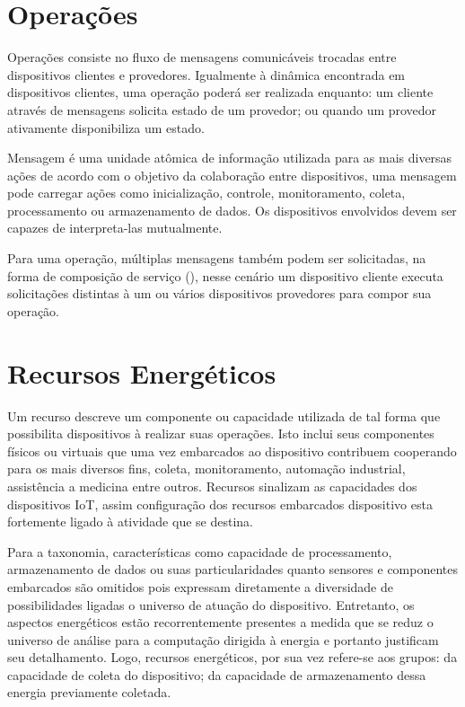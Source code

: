 \section{Operações}
Operações consiste no fluxo de mensagens comunicáveis trocadas entre dispositivos clientes e provedores. Igualmente à dinâmica encontrada em dispositivos clientes, uma operação poderá ser realizada enquanto: um cliente através de mensagens solicita estado de um provedor; ou quando um provedor ativamente disponibiliza um estado.

Mensagem é uma unidade atômica de informação utilizada para as mais diversas ações de acordo com o objetivo da colaboração entre dispositivos, uma mensagem pode carregar ações como inicialização, controle, monitoramento, coleta, processamento ou armazenamento de dados. Os dispositivos envolvidos devem ser capazes de interpreta-las mutualmente. 

Para uma operação, múltiplas mensagens também podem ser solicitadas, na forma de  composição de serviço \citeauthor{kahloul_service_2019}(\citeyear{kahloul_service_2019}), nesse cenário um dispositivo cliente executa solicitações distintas à um ou vários dispositivos provedores para compor sua operação.

\section{Recursos Energéticos}

Um recurso descreve um componente ou capacidade utilizada de tal forma que possibilita dispositivos à realizar suas operações. Isto inclui seus componentes físicos ou virtuais que uma vez embarcados ao dispositivo contribuem cooperando para os mais diversos fins, coleta, monitoramento, automação industrial, assistência a medicina entre outros. Recursos sinalizam as capacidades dos dispositivos \acs{IoT}, assim configuração dos recursos embarcados dispositivo esta fortemente ligado à atividade que se destina. 

Para a taxonomia, características como capacidade de processamento, armazenamento de dados ou suas particularidades quanto sensores e componentes embarcados são omitidos pois expressam diretamente a diversidade de possibilidades ligadas o universo de atuação do dispositivo. Entretanto, os aspectos energéticos estão recorrentemente presentes a medida que se reduz o universo de análise para a computação dirigida à energia e portanto justificam seu detalhamento. Logo, recursos energéticos, por sua vez refere-se aos grupos: da capacidade de coleta do dispositivo; da capacidade de armazenamento dessa energia previamente coletada. 

